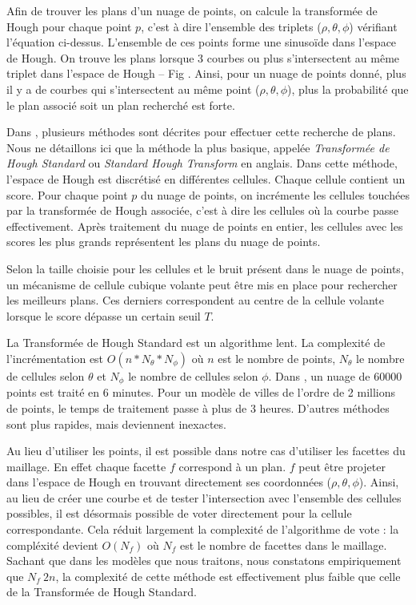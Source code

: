 \documentclass[12pt, twoside]{article}
\begin{document}
Afin de trouver les plans d’un nuage de points, on calcule la transformée de Hough pour chaque point $p$, c’est à dire l’ensemble des triplets ($\rho, \theta, \phi$) vérifiant l’équation ci-dessus. L’ensemble de ces points forme une sinusoïde dans l’espace de Hough. On trouve les plans lorsque 3 courbes ou plus s’intersectent au même triplet dans l’espace de Hough -- Fig . Ainsi, pour un nuage de points donné, plus il y a de courbes qui s’intersectent au même point ($\rho, \theta, \phi$), plus la probabilité que le plan associé soit un plan recherché est forte.

Dans \cite{Hough1}, plusieurs méthodes sont décrites pour effectuer cette recherche de plans. Nous ne détaillons ici que la méthode la plus basique, appelée \textit{Transformée de Hough Standard} ou \textit{Standard Hough Transform} en anglais. Dans cette méthode, l'espace de Hough est discrétisé en différentes cellules. Chaque cellule contient un score. Pour chaque point $p$ du nuage de points, on incrémente les cellules touchées par la transformée de Hough associée, c'est à dire les cellules où la courbe passe effectivement. Après traitement du nuage de points en entier, les cellules avec les scores les plus grands représentent les plans du nuage de points.

Selon la taille choisie pour les cellules et le bruit présent dans le nuage de points, un mécanisme de cellule cubique volante peut être mis en place pour rechercher les meilleurs plans. Ces derniers correspondent au centre de la cellule volante lorsque le score dépasse un certain seuil $T$.

La Transformée de Hough Standard est un algorithme lent. La complexité de l'incrémentation est $O(n*N_{\theta}*N_{\phi})$ où $n$ est le nombre de points, $N_{\theta}$ le nombre de cellules selon $\theta$ et $N_{\phi}$ le nombre de cellules selon $\phi$. Dans \cite{Hough1}, un nuage de 60000 points est traité en 6 minutes. Pour un modèle de villes de l'ordre de 2 millions de points, le temps de traitement passe à plus de 3 heures. D'autres méthodes sont plus rapides, mais deviennent inexactes.

Au lieu d'utiliser les points, il est possible dans notre cas d'utiliser les facettes du maillage. En effet chaque facette $f$ correspond à un plan. $f$ peut être projeter dans l'espace de Hough en trouvant directement ses coordonnées ($\rho, \theta, \phi$). Ainsi, au lieu de créer une courbe et de tester l'intersection avec l'ensemble des cellules possibles, il est désormais possible de voter directement pour la cellule correspondante. Cela réduit largement la complexité de l'algorithme de vote : la compléxité devient $O(N_f)$ où $N_f$ est le nombre de facettes dans le maillage. Sachant que dans les modèles que nous traitons, nous constatons empiriquement que $N_f ~ 2n$, la complexité de cette méthode est effectivement plus faible que celle de la Transformée de Hough Standard.
\end{document}
